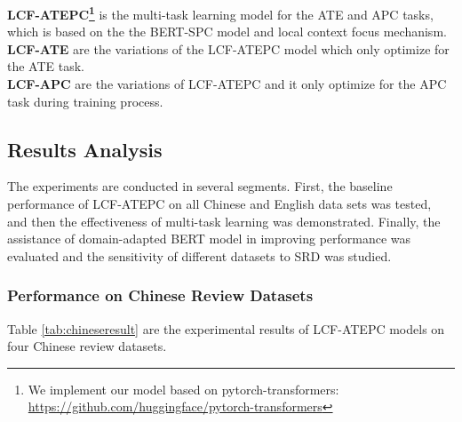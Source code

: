 \documentclass[a4paper,fleqn]{cas-sc}
\begin{document}
\textbf{LCF-ATEPC\footnote{We implement our model based on pytorch-transformers: \url{ https://github.com/huggingface/pytorch-transformers}}} is the multi-task learning model for the ATE and APC tasks, which is based on the the BERT-SPC model and local context focus mechanism. \\
\textbf{LCF-ATE} are the variations of the LCF-ATEPC model which only optimize for the ATE task. \\
\textbf{LCF-APC} are the variations of LCF-ATEPC and it only optimize for the APC task during training process.\\

\subsection{Results Analysis}
The experiments are conducted in several segments. First, the baseline performance of LCF-ATEPC on all Chinese and English data sets was tested, and then the effectiveness of multi-task learning was demonstrated. Finally, the assistance of domain-adapted BERT model in improving performance was evaluated and the sensitivity of different datasets to SRD was studied.

\subsubsection{Performance on Chinese Review Datasets}

Table \ref{tab:chineseresult} are the experimental results of LCF-ATEPC models on four Chinese review datasets.
\end{document}
